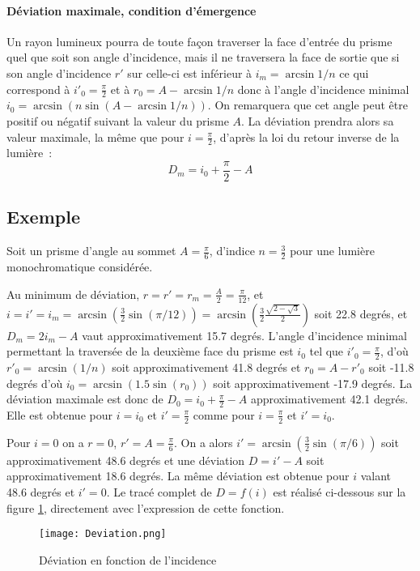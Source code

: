 \paragraph{Déviation maximale, condition d'émergence}

Un rayon lumineux pou\-rra de toute façon traverser la face d'entrée du prisme quel que soit son angle d'incidence, mais il ne traversera la face de sortie que si son angle d'incidence $r'$ sur celle-ci est inférieur à $i_m = \arcsin 1/n$ ce qui correspond à $i'_0 = \frac{\pi}{2}$ et à $r_0 = A - \arcsin 1/n$ donc à l'angle d'incidence minimal $i_0 = \arcsin(n\sin(A-\arcsin 1/n))$. On remarquera que cet angle peut être positif ou négatif suivant la valeur du prisme $A$. La déviation prendra alors sa valeur maximale, la même que pour $i=\frac{\pi}{2}$, d'après la loi du retour inverse de la lumière~:\begin{equation}
	D_m = i_0 +\frac{\pi}{2} - A
\end{equation}

\subsection{Exemple}
\label{chap6-subsec:exemple}
Soit un prisme d'angle au sommet $A = \frac{\pi}{6}$, d'indice $n=\frac{3}{2}$ pour une lumière monochromatique considérée.

Au minimum de déviation, $r=r'=r_m=\frac{A}{2}=\frac{\pi}{12}$, et $i=i'=i_m=\arcsin\left(\frac{3}{2}\sin(\pi/12)\right) = \arcsin\left(\frac{3}{2} \frac{\sqrt{2-\sqrt{3}}}{2}\right)$ soit 22.8 degrés, et $D_m=2i_m-A$ vaut approximativement 15.7 degrés.
L'angle d'incidence minimal permettant la traversée de la deuxième face du prisme est $i_0$ tel que $i'_0=\frac{\pi}{2}$, d'où $r'_0 = \arcsin(1/n)$ soit approximativement 41.8 degrés et $r_0=A-r'_0$ soit -11.8 degrés d'où $i_0=\arcsin(1.5 \sin(r_0))$ soit approximativement -17.9 degrés. La déviation maximale est donc de $D_0 = i_0 + \frac{\pi}{2}-A$ approximativement 42.1 degrés. Elle est obtenue pour $i=i_0$ et $i'=\frac{\pi}{2}$ comme pour $i=\frac{\pi}{2}$ et $i'=i_0$.

Pour $i=0$ on a $r=0$, $r'=A=\frac{\pi}{6}$. On a alors $i'=\arcsin(\frac{3}{2}\sin(\pi/6))$ soit approximativement 48.6 degrés et une déviation $D=i'-A$ soit approximativement 18.6 degrés. La même déviation est obtenue pour $i$ valant 48.6 degrés et $i'=0$.
Le tracé complet de $D=f(i)$ est réalisé ci-dessous sur la figure \ref{fig:chap6-deviation}, directement avec l'expression de cette fonction.
\begin{figure}
	\centering
	\texttt{[image: Deviation.png]}
	\caption{Déviation en fonction de l'incidence}
	\label{fig:chap6-deviation}
\end{figure}
